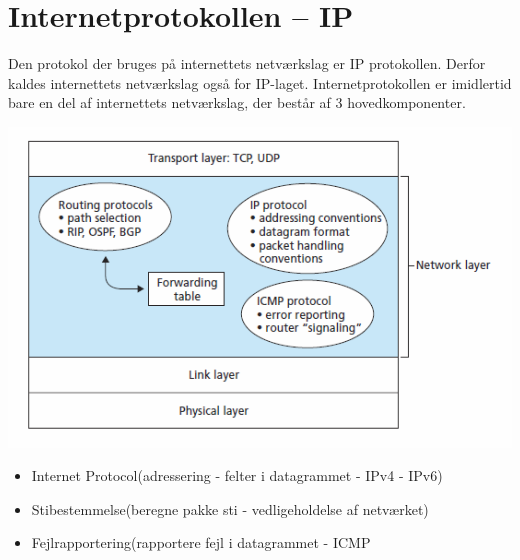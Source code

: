 {{{{{\section{Internetprotokollen – IP}
Den protokol der bruges på internettets netværkslag er IP protokollen. 
Derfor kaldes internettets netværkslag også for IP-laget. Internetprotokollen er imidlertid bare en del af internettets netværkslag, der består af 3 hovedkomponenter.
\begin{center}
  \includegraphics{4-network-layer/networklayer.png}
\end{center}
\begin{itemize}
	\item Internet Protocol(adressering - felter i datagrammet - IPv4 - IPv6)
	\item Stibestemmelse(beregne pakke sti - vedligeholdelse af netværket)
	\item Fejlrapportering(rapportere  fejl i datagrammet - ICMP
\end{itemize}

}}}}}
